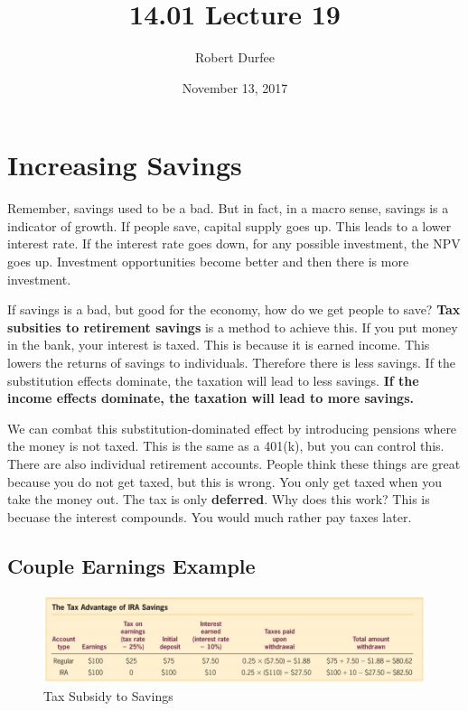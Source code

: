 \documentclass{article}
\title{ 14.01 Lecture 19 }
\author{ Robert Durfee }
\date{ November 13, 2017 }
\begin{document}
\maketitle

\section{ Increasing Savings }

Remember, savings used to be a bad. But in fact, in a macro sense, savings is a
indicator of growth. If people save, capital supply goes up. This leads to a
lower interest rate. If the interest rate goes down, for any possible
investment, the NPV goes up. Investment opportunities become better and then
there is more investment.

If savings is a bad, but good for the economy, how do we get people to save?
\textbf{Tax subsities to retirement savings} is a method to achieve this. If you
put money in the bank, your interest is taxed. This is because it is earned
income. This lowers the returns of savings to individuals. Therefore there is
less savings. If the substitution effects dominate, the taxation will lead to
less savings. \textbf{If the income effects dominate, the taxation will lead to
more savings.}

We can combat this substitution-dominated effect by introducing pensions where
the money is not taxed. This is the same as a 401(k), but you can control this.
There are also individual retirement accounts. People think these things are
great because you do not get taxed, but this is wrong. You only get taxed when
you take the money out. The tax is only \textbf{deferred}. Why does this work?
This is becuase the interest compounds. You would much rather pay taxes later.

\subsection{Couple Earnings Example}

\begin{figure}[H]
    \centering
    \includegraphics[scale=0.70]{"Figure 1"}
    \caption{Tax Subsidy to Savings}
\end{figure}
\end{document}
